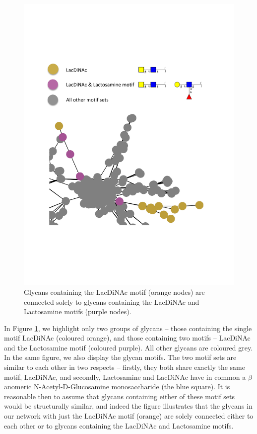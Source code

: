 \documentclass[12pt,a4paper]{article}
\begin{document}
\begin{figure}[H]
\centering 
\includegraphics[scale=0.9]{motif_similarity_exploration/LacDiNAc_vs_Lactosamine_motif_LacDiNAc.pdf} 
\caption{Glycans containing the LacDiNAc motif (orange nodes) are connected solely to glycans containing the LacDiNAc and Lactosamine motifs (purple nodes).}
\label{fig:LacDiNAc_vs_Lactosamine motif,LacDiNAc}
\end{figure}

In Figure \ref{fig:LacDiNAc_vs_Lactosamine motif,LacDiNAc}, we highlight only two groups of glycans -- those containing the single motif LacDiNAc (coloured orange), and those containing two motifs -- LacDiNAc and the Lactosamine motif (coloured purple). All other glycans are coloured grey. In the same figure, we also display the glycan motifs. The two motif sets are similar to each other in two respects -- firstly, they both share exactly the same motif, LacDiNAc, and secondly, Lactosamine and LacDiNAc have in common a $\beta$ anomeric N-Acetyl-D-Glucosamine monosaccharide (the blue square). It is reasonable then to assume that glycans containing either of these motif sets would be structurally similar, and indeed the figure illustrates that the glycans in our network with just the LacDiNAc motif  (orange) are solely connected either to each other or to glycans containing the LacDiNAc and Lactosamine motifs.
\end{document}
